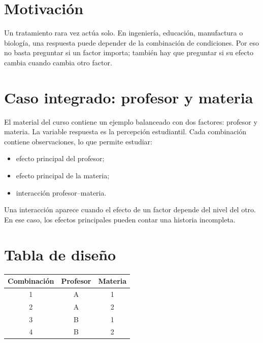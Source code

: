 
\section{Motivación}

Un tratamiento rara vez actúa solo. En ingeniería, educación, manufactura o biología, una respuesta puede depender de la combinación de condiciones. Por eso no basta preguntar si un factor importa; también hay que preguntar si su efecto cambia cuando cambia otro factor.

\section{Caso integrado: profesor y materia}

El material del curso contiene un ejemplo balanceado con dos factores: profesor y materia. La variable respuesta es la percepción estudiantil. Cada combinación contiene observaciones, lo que permite estudiar:

\begin{itemize}
  \item efecto principal del profesor;
  \item efecto principal de la materia;
  \item interacción profesor--materia.
\end{itemize}

\begin{idea}
Una interacción aparece cuando el efecto de un factor depende del nivel del otro. En ese caso, los efectos principales pueden contar una historia incompleta.
\end{idea}

\section{Tabla de diseño}

\begin{table}[H]
\centering
\begin{tabular}{ccc}
\toprule
Combinación & Profesor & Materia\\
\midrule
1 & A & 1\\
2 & A & 2\\
3 & B & 1\\
4 & B & 2\\
\bottomrule
\end{tabular}
\end{table}

